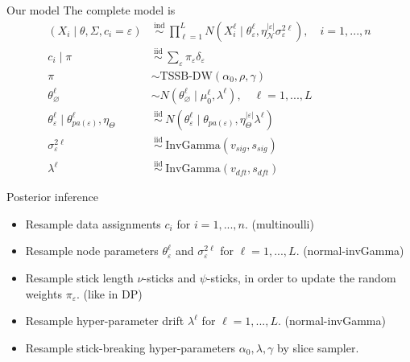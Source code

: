 \documentclass[10 pt]{beamer}
\begin{document}
\begin{frame}{Our model}
The complete model is
$$
\begin{aligned}
\left( X_{i} \mid \theta, \Sigma, c_i=\varepsilon \right) & \stackrel{\text { ind }}{\sim} \prod_{\ell=1}^L N\left(X_{i}^\ell \mid \theta_{\varepsilon}^\ell, \eta_{\mathcal{N}}^{|\varepsilon|}\sigma_{\varepsilon}^{2\ell}\right), \quad i = 1,...,n \\
c_{i} \mid \pi & \stackrel{\text { iid }}{\sim} \sum_{\varepsilon} \pi_{\varepsilon} \delta_{{\varepsilon}} \\
\pi&\sim \text{TSSB-DW}(\alpha_0, \rho,\gamma)\\
\theta_{\varnothing}^\ell &\sim N(\theta_{\varnothing}^\ell\mid \mu_0^\ell,  \lambda^\ell), \quad \ell=1,...,L\\
\theta_{\varepsilon}^\ell \mid \theta_{pa(\varepsilon)}^\ell, \eta_{\Theta}& \stackrel{\text { iid }}{\sim} N(\theta_{\varepsilon}^\ell\mid \theta_{pa(\varepsilon)}, \eta_{\Theta}^{|\varepsilon|}\lambda^\ell)\\
\sigma_{\varepsilon}^{2\ell} &\stackrel{\text { iid }}{\sim} \text{InvGamma}(v_{sig}, s_{sig})\\
\lambda^\ell & \stackrel{\text { iid }}{\sim} \text{InvGamma}(v_{dft}, s_{dft})
\end{aligned}
$$
\end{frame}

\begin{frame}{Posterior inference}
	
\begin{itemize}
\item Resample data assignments $c_i$ for $i=1,...,n$. (multinoulli)

\item Resample node parameters $\theta_{\varepsilon}^\ell$ and $\sigma_{\varepsilon}^{2\ell}$ for $\ell = 1,...,L$. (normal-invGamma)

\item Resample stick length $\nu$-sticks and $\psi$-sticks, in order to update the random weights $\pi_\varepsilon$. (like in DP)

\item Resample hyper-parameter drift $\lambda^\ell$ for $\ell = 1,...,L$. (normal-invGamma)

\item Resample stick-breaking hyper-parameters $\alpha_0,\lambda,\gamma$ by slice sampler.
\end{itemize}

\end{frame}
\end{document}
